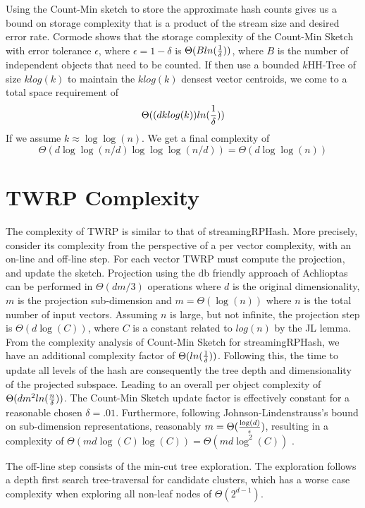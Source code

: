 Using the Count-Min sketch to store the approximate hash counts gives us a bound on storage
complexity that is a product of the stream size and desired error rate.  
Cormode \cite{cormode2} shows that the storage complexity of the Count-Min Sketch with error tolerance
$\epsilon$, where $\epsilon = 1-\delta$ is $\Theta( B ln({{1}\over{\delta}}))$, where $B$ is the number of
independent objects that need to be counted.
If then use a bounded $k$HH-Tree of size $klog(k)$ to maintain the $klog(k)$ densest
vector centroids, we come to a total space requirement of 
$$\Theta((d k log(k))ln({{1}\over{\delta}}))$$
If we assume $k\approx \log\log(n)$. We get a final complexity of
$$\Theta(d \log\log(n/d) \log\log\log(n/d)) =\Theta(d\log\log(n)) $$
 
\section{TWRP Complexity}
The complexity of \textsf{TWRP} is similar to that of \textsf{streamingRPHash}.  More precisely, consider its
complexity from the perspective of a per vector complexity, with an on-line and off-line step.  For
each vector \textsf{TWRP}  must compute the projection, and update the sketch.  Projection using the db
friendly approach of Achlioptas \cite{Achlioptas01} can be performed in $\Theta(dm/3)$ operations
where $d$ is the original dimensionality, $m$ is the projection sub-dimension and
$m=\Theta(\log(n))$ where $n$ is the total number of input vectors.  Assuming $n$ is large, but not
infinite, the projection step is $\Theta(d\log(C))$, where $C$ is a constant related to $log(n)$ by the JL 
lemma.  From the complexity analysis of Count-Min Sketch for \textsf{streamingRPHash}, we have an additional 
complexity factor of $\Theta(ln({{1}\over{\delta}}))$.  Following this, the time to update all levels of the hash are
consequently the tree depth and dimensionality of the projected subspace.  Leading to an overall per
object complexity of $\Theta( d m^2 ln({{n}\over{\delta}}) )$.  The Count-Min Sketch update factor
is effectively constant for a reasonable chosen $\delta=.01$.  Furthermore, following
Johnson-Lindenstrauss's bound on sub-dimension representations, reasonably $m =
\Theta({{\log(d)}\over {\epsilon}}) $, resulting in a complexity of $\Theta(
m d\log(C)\log(C))=\Theta(m d \log^2(C))$ .

The off-line step consists of the min-cut tree exploration.  The exploration follows a depth first
search tree-traversal for candidate clusters, which has a worse case complexity when exploring all
non-leaf nodes of $\Theta( 2^{d-1})$.

